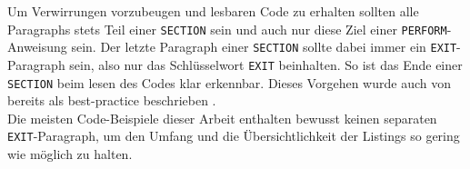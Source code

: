Um Verwirrungen vorzubeugen und lesbaren Code zu erhalten sollten alle Paragraphs stets Teil einer \texttt{SECTION} sein und auch nur diese Ziel einer \texttt{PERFORM}-Anweisung sein. Der letzte Paragraph einer \texttt{SECTION} sollte dabei immer ein \texttt{EXIT}-Paragraph sein, also nur das Schlüsselwort \texttt{EXIT} beinhalten. So ist das Ende einer \texttt{SECTION} beim lesen des Codes klar erkennbar. Dieses Vorgehen wurde auch von \citeauthor{richards_enhancing_1984} bereits \citeyear{richards_enhancing_1984} als best-practice beschrieben  \cite{richards_enhancing_1984}.\\

Die meisten Code-Beispiele dieser Arbeit enthalten bewusst keinen separaten \texttt{EXIT}-Paragraph, um den Umfang und die Übersichtlichkeit der Listings so gering wie möglich zu halten. 